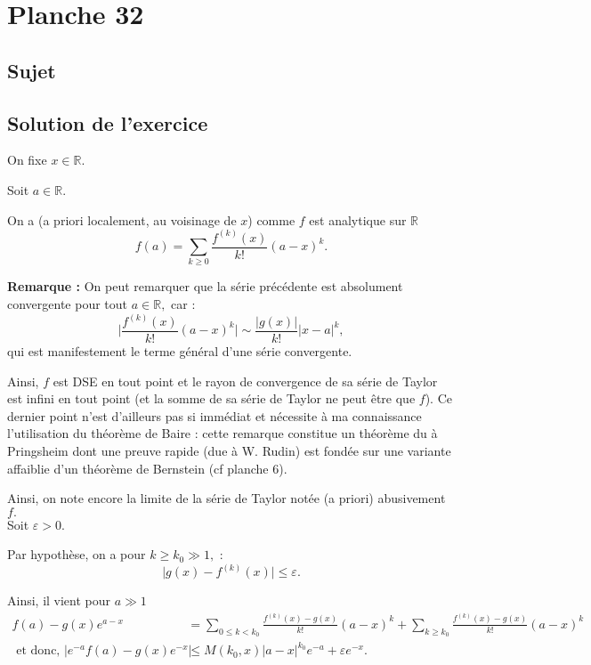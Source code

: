 \chapter{Planche 32}

\section{Sujet}

\section{Solution de l'exercice}

On fixe $x\in \mathbb{R}.$

Soit $a\in \mathbb{R}.$

On a (a priori localement, au voisinage de $x$) comme $f$ est analytique sur $\mathbb{R}$
$$f(a)=\sum_{k\geq 0}\frac{f^{(k)}(x)}{k!}(a-x)^{k}.$$

\textbf{Remarque :} On peut remarquer que la série précédente est absolument convergente pour tout $a\in \mathbb{R},$ car : $$\vert \frac{f^{(k)}(x)}{k!}(a-x)^{k}\vert \sim \frac{\vert g(x) \vert }{k!}\vert x-a\vert^{k},$$ qui est manifestement le terme général d'une série convergente. 

Ainsi, $f$ est DSE en tout point et le rayon de convergence de sa série de Taylor est infini en tout point (et la somme de sa série de Taylor ne peut être que $f$). Ce dernier point n'est d'ailleurs pas si immédiat et nécessite à ma connaissance l'utilisation du théorème de Baire : cette remarque constitue un théorème du à Pringsheim dont une preuve rapide (due à W. Rudin) est fondée sur une variante affaiblie d'un théorème de Bernstein (cf planche 6).

Ainsi, on note encore la limite de la série de Taylor notée (a priori) abusivement $f.$\\

Soit $\varepsilon>0.$

Par hypothèse, on a pour $k\geq k_{0}\gg 1,$ : $$\vert g(x)-f^{(k)}(x)\vert \leq \varepsilon.$$

Ainsi, il vient pour $a\gg 1$
\begin{align*}
f(a)-g(x)e^{a-x} & =\sum_{0\leq k< k_{0}}\frac{f^{(k)}(x)-g(x)}{k!}(a-x)^{k}+\sum_{k\geq k_{0}}\frac{f^{(k)}(x)-g(x)}{k!}(a-x)^{k}\\
\mbox{ et donc, } \vert e^{-a}f(a)-g(x)e^{-x}\vert & \leq M(k_{0},x)\vert a-x\vert^{k_{0}}e^{-a}+\varepsilon e^{-x}.
\end{align*}

